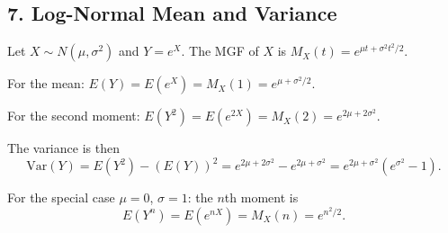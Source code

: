 \documentclass{article}
\begin{document}
\subsection*{7. Log-Normal Mean and Variance}

Let $X \sim N(\mu, \sigma^2)$ and $Y = e^X$. The MGF of $X$ is $M_X(t) = e^{\mu t + \sigma^2 t^2/2}$.

For the mean: $E(Y) = E(e^X) = M_X(1) = e^{\mu + \sigma^2/2}$.

For the second moment: $E(Y^2) = E(e^{2X}) = M_X(2) = e^{2\mu + 2\sigma^2}$.

The variance is then
$$
\text{Var}(Y) = E(Y^2) - (E(Y))^2 = e^{2\mu + 2\sigma^2} - e^{2\mu + \sigma^2} = e^{2\mu + \sigma^2}(e^{\sigma^2} - 1).
$$

For the special case $\mu = 0$, $\sigma = 1$: the $n$th moment is
$$
E(Y^n) = E(e^{nX}) = M_X(n) = e^{n^2/2}.
$$
\end{document}
